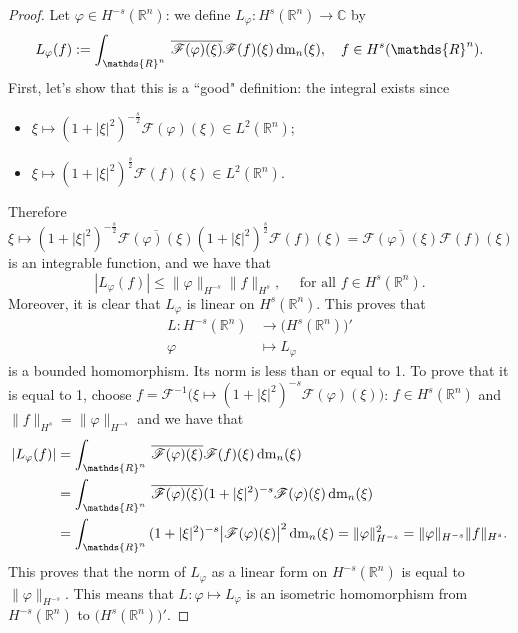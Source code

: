 \documentclass[a4paper, 12pt]{article}
\theoremstyle{plain}
\theoremstyle{definition}
\theoremstyle{remark}
\numberwithin{equation}{section}
\begin{document}
\begin{proof}
Let $\varphi \in H^{-s}({\mathds{R}}^n)$: we define $L_{\varphi}: H^s({\mathds{R}}^n)\to {\mathds{C}}$ by 
\[
L_{\varphi}(f):=\int_{{\mathds{R}}^n}\,\overline{{\mathscr{F}}(\varphi)(\xi)}{\mathscr{F}}(f)(\xi)\,{\rm dm}_n(\xi), \quad f\in H^s({\mathds{R}}^n).
\]
First, let's show that this is a ``good" definition: the integral exists since
%
\begin{itemize}
\item[-]
$\xi\mapsto (1+|\xi|^2)^{-\frac{s}{2}}{\mathscr{F}}(\varphi)(\xi) \in L^2({\mathds{R}}^n)$;
\item[-]
$\xi\mapsto (1+|\xi|^2)^{\frac{s}{2}}{\mathscr{F}}(f)(\xi) \in L^2({\mathds{R}}^n)$.
\end{itemize}
%
Therefore $\xi\mapsto (1+|\xi|^2)^{-\frac{s}{2}}\overline{{\mathscr{F}}(\varphi)(\xi)}(1+|\xi|^2)^{\frac{s}{2}}{\mathscr{F}}(f)(\xi)
=\overline{{\mathscr{F}}(\varphi)(\xi)}{\mathscr{F}}(f)(\xi)$ is an integrable function, and we have that
\[
|L_{\varphi}(f)|\le \|\varphi\|_{H^{-s}}\|f\|_{H^s}, \quad \mbox{ for all } f\in H^s({\mathds{R}}^n).
\]
Moreover, it is clear that $L_{\varphi}$ is linear on $H^s({\mathds{R}}^n)$. This proves that 
%
\begin{align*}
L:H^{-s}({\mathds{R}}^n)& \longrightarrow \bigl(H^s({\mathds{R}}^n)\bigr)'\\
\varphi&\longmapsto L_\varphi
\end{align*}
%
is a bounded homomorphism. Its norm is less than or equal to 1. To prove that it is equal to 1, choose 
$f={\mathscr{F}}^{-1}\bigl(\xi\mapsto (1+|\xi|^2)^{-s}{\mathscr{F}}(\varphi)(\xi)\bigr)$: $f\in H^s({\mathds{R}}^n)$
and $\|f\|_{H^s}=\|\varphi\|_{H^{-s}}$ and we have that
%
\begin{align*}
|L_\varphi(f)|&=\int_{{\mathds{R}}^n}\,\overline{{\mathscr{F}}(\varphi)(\xi)}{\mathscr{F}}(f)(\xi)\,{\rm dm}_n(\xi)\\
&=\int_{{\mathds{R}}^n}\,\overline{{\mathscr{F}}(\varphi)(\xi)} (1+|\xi|^2)^{-s}{\mathscr{F}}(\varphi)(\xi)\,{\rm dm}_n(\xi)\\
&=\int_{{\mathds{R}}^n}\,(1+|\xi|^2)^{-s}\bigl|{\mathscr{F}}(\varphi)(\xi)\bigr|^2\,{\rm dm}_n(\xi)
=\|\varphi\|_{H^{-s}}^2 = \|\varphi\|_{H^{-s}} \|f\|_{H^s}.
\end{align*}
%
This proves that the norm of $L_{\varphi}$ as a linear form on $H^{-s}({\mathds{R}}^n)$ is equal to $\|\varphi\|_{H^{-s}}$.
This means that $L:\varphi\mapsto L_\varphi$ is an isometric homomorphism from $H^{-s}({\mathds{R}}^n)$ to 
$\bigl(H^s({\mathds{R}}^n)\bigr)'$.


\end{proof}
\end{document}
